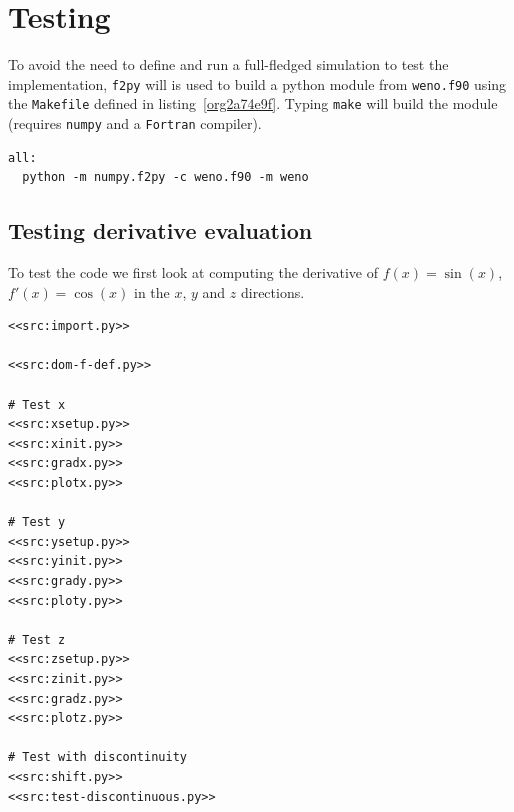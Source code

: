 \documentclass[11pt]{article}
\begin{document}
\section{Testing}
\label{sec:orgaf5e925}

To avoid the need to define and run a full-fledged simulation to test the implementation, \texttt{f2py} will
is used to build a python module from \texttt{weno.f90} using the \texttt{Makefile} defined in listing~\ref{org2a74e9f}.
Typing \texttt{make} will build the module (requires \texttt{numpy} and a \texttt{Fortran} compiler).

\begin{lstlisting}
all:
  python -m numpy.f2py -c weno.f90 -m weno
\end{lstlisting}

\subsection{Testing derivative evaluation}
\label{sec:org563f577}

To test the code we first look at computing the derivative of \(f\left(x\right)=\sin\left(x\right)\),
\(f'\left(x\right)=\cos\left(x\right)\) in the \(x\), \(y\) and \(z\) directions.

\begin{lstlisting}
<<src:import.py>>

<<src:dom-f-def.py>>

# Test x
<<src:xsetup.py>>
<<src:xinit.py>>
<<src:gradx.py>>
<<src:plotx.py>>

# Test y
<<src:ysetup.py>>
<<src:yinit.py>>
<<src:grady.py>>
<<src:ploty.py>>

# Test z
<<src:zsetup.py>>
<<src:zinit.py>>
<<src:gradz.py>>
<<src:plotz.py>>

# Test with discontinuity
<<src:shift.py>>
<<src:test-discontinuous.py>>
\end{lstlisting}
\end{document}
